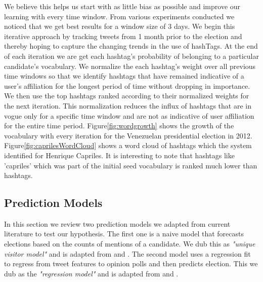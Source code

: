 \begin{comment}
\begin{table*}[Ht]
	\centering
	\begin{tabular}{| l | l | l | l |}
	\hline
	Election Type & Number of Elections & Number of Correct Predictions & Accuracy\\
	\hline
	President/Prime Minister & 8 & 7 & 87.5\%\\
	Governor & 4 & 3 & 75\%\\
	Mayor & 24 & 12 & 50\%\\
	Overall & 36 & 22 & 61.1\%\\
	\hline
	\end{tabular}
	\vspace{-0.5em}
	\caption{Track Record of Prediction Algorithms}
	\label{table:trackRecord}
	\vspace{-0.5em}
\end{table*}
\end{comment}
We believe this helps us start with as little bias as possible and improve our learning with every time window.
From various experiments conducted we noticed that we get best results for a window size of 3 days. 
We begin this iterative approach by tracking tweets from 1 month prior to the election and thereby hoping to capture the changing trends in the use of hashTags.
At the end of each iteration we are get each hashtag's probability of belonging to a particular candidate's vocabulary. 
We normalize the each hashtag's weight over all previous time windows so that we identify hashtags that have remained indicative of a user's affiliation for the longest period of time without dropping in importance. 
We then use the top hashtags ranked according to their normalized weights  for the next iteration.
This normalization reduces the influx of hashtags that are in vogue only for a specific time window and are not as indicative of user affiliation for the entire time period. 
Figure\ref{fig:wordgrowth} shows the growth of the vocabulary with every iteration for the Venezuelan presidential election in 2012.
Figure\ref{fig:caprilesWordCloud} shows a word cloud of hashtags which the system identified for Henrique Capriles.
It is interesting to note that hashtags like 'capriles' which was part of the initial seed vocabulary is ranked much lower than hashtags.

\subsection{Prediction Models}
In this section we review two prediction models we adapted from current literature to test our hypothesis. 
The first one is a naive model that forecasts elections based on the counts of mentions of a candidate.
We dub this as  \emph{"unique visitor model"} and is adapted from \cite{saez2011total} and \cite{tumasjan2010predicting}.
The second model uses a regression fit to regress from tweet features to opinion polls and then predicts election. 
This we dub as the \emph{"regression model"} and is adapted from \cite{bermingham2011using} and \cite{o2010tweets}.

